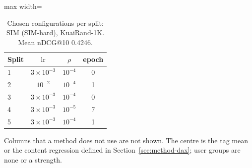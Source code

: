 \begin{table}[tbp]
\centering
\footnotesize
\caption{Chosen configurations per split: SIM (SIM-hard), KuaiRand-1K. Mean nDCG@10 0.4246.}
\label{tab:grid16}
\begin{adjustbox}{max width=\linewidth}
\begin{tabular}{lccc}
\toprule
Split & $\mathrm{lr}$ & $\rho$ & epoch \\
\midrule
1 & $3\times10^{-3}$ & $10^{-4}$ & 0 \\
2 & $10^{-2}$ & $10^{-4}$ & 1 \\
3 & $3\times10^{-3}$ & $10^{-4}$ & 0 \\
4 & $3\times10^{-3}$ & $10^{-5}$ & 7 \\
5 & $3\times10^{-3}$ & $10^{-4}$ & 1 \\
\bottomrule
\end{tabular}
\end{adjustbox}
\par\smallskip
\begin{minipage}{\linewidth}\raggedright\footnotesize Columns that a method does not use are not shown. The centre is the tag mean or the content regression defined in Section~\ref{sec:method-dax}; user groups are none or a strength.\end{minipage}
\end{table}
